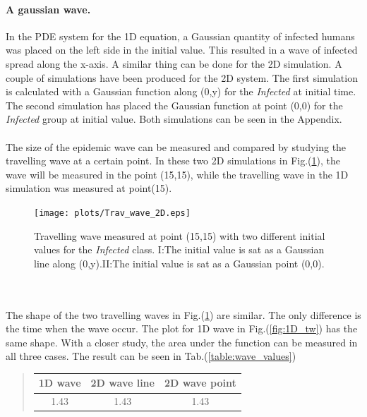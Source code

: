 \documentclass[%
twoside,                 %
final,                   %
10pt]{article}
\begin{document}
\paragraph{A gaussian wave.}
In the PDE system for the 1D equation, a Gaussian quantity of infected humans was placed on the left side in the initial value. This resulted in a wave of infected spread along the x-axis. A similar thing can be done for the 2D simulation. A couple of simulations have been produced for the 2D system. The first simulation is calculated with a Gaussian function along (0,y) for the \emph{Infected} at initial time. The second simulation has placed the Gaussian function at point (0,0) for the \emph{Infected} group at initial value. Both simulations can be seen in the Appendix.  
\\
\\
The size of the epidemic wave can be measured and compared by studying the travelling wave at a certain point. In these two 2D simulations in Fig.(\ref{fig:2D_trav_wave}), the wave will be measured in the point (15,15), while the travelling wave in the 1D simulation was measured at point(15). 


\begin{figure}[ht]
  \centerline{\texttt{[image: plots/Trav\_wave\_2D.eps]}}
  \caption{
  \label{fig:2D_trav_wave} Travelling wave measured at point (15,15) with two different initial values for the \emph{Infected} class. I:The initial value is sat as a Gaussian line along (0,y).II:The initial value is sat as a Gaussian point (0,0).
  }
\end{figure}


\\
\\
The shape of the two travelling waves in Fig.(\ref{fig:2D_trav_wave}) are similar. The only difference is the time when the wave occur. The plot for 1D wave in Fig.(\ref{fig:1D_tw}) has the same shape. With a closer study, the area under the function can be measured in all three cases. The result can be seen in Tab.(\ref{table:wave_values})   


\label{table:wave_values}

\begin{quote}
\begin{tabular}{ccc}
\hline
\multicolumn{1}{c}{ 1D wave } & \multicolumn{1}{c}{ 2D wave line } & \multicolumn{1}{c}{ 2D wave point } \\
\hline
1.43          & 1.43          & 1.43          \\
\hline
\end{tabular}
\end{quote}
\end{document}
